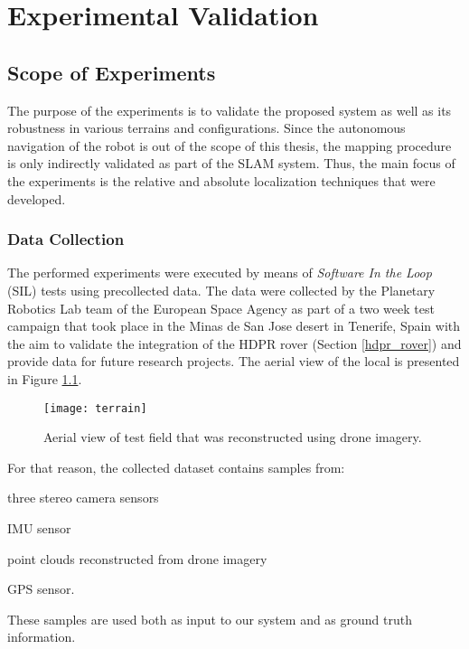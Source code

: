 \label{Chapter4}

\newlength\figureheight
\newlength\figurewidth

\chapter{Experimental Validation}

\section{Scope of Experiments}

The purpose of the experiments is to validate the proposed system as
well as its robustness in various terrains and configurations.
Since the autonomous navigation of the robot is out of the scope of this
thesis, the mapping procedure is only indirectly validated as part of the
SLAM system.
Thus, the main focus of the experiments is the relative and absolute
localization techniques that were developed.

\subsection{Data Collection}

The performed experiments were executed by means of
\textit{Software In the Loop} (SIL) tests using precollected data.
The data were collected by the Planetary Robotics Lab team of the European
Space Agency as part of a two week test campaign that took
place in the Minas de San Jose desert in Tenerife, Spain with the aim to
validate the integration of the HDPR rover (Section \ref{hdpr_rover}) and
provide data for future research projects.
The aerial view of the local is presented in Figure \ref{fig:terrain}.

\begin{figure}[h!]
    \centering
    \texttt{[image: terrain]}
    \caption[Aerial view of test field]{
        Aerial view of test field that was reconstructed using drone
        imagery.
    }
    \label{fig:terrain}
\end{figure}

For that reason, the collected dataset contains samples from:
\begin{enumerate*}[label=(\roman*)]
        \item three stereo camera sensors
        \item IMU sensor
        \item point clouds reconstructed from drone imagery
        \item GPS sensor.
\end{enumerate*}
These samples are used both as input to our system and as ground truth
information.

